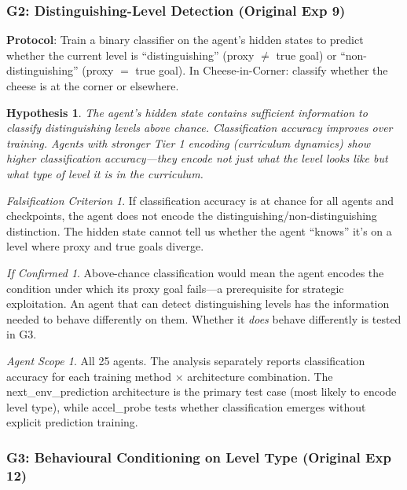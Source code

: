 \documentclass[11pt,a4paper]{article}
\newtheorem{hypothesis}{Hypothesis}[subsection]
\theoremstyle{remark}
\newtheorem*{falsification}{Falsification Criterion}
\newtheorem*{implication}{If Confirmed}
\newtheorem*{agentscope}{Agent Scope}
\begin{document}
\subsubsection{G2: Distinguishing-Level Detection (Original Exp 9)}
\label{exp:gmg2}

\textbf{Protocol}: Train a binary classifier on the agent's hidden states to predict whether the current level is ``distinguishing'' (proxy $\neq$ true goal) or ``non-distinguishing'' (proxy $=$ true goal). In Cheese-in-Corner: classify whether the cheese is at the corner or elsewhere.

\begin{hypothesis}
The agent's hidden state contains sufficient information to classify distinguishing levels above chance. Classification accuracy improves over training. Agents with stronger Tier 1 encoding (curriculum dynamics) show higher classification accuracy---they encode not just what the level looks like but what type of level it is in the curriculum.
\end{hypothesis}

\begin{falsification}
If classification accuracy is at chance for all agents and checkpoints, the agent does not encode the distinguishing/non-distinguishing distinction. The hidden state cannot tell us whether the agent ``knows'' it's on a level where proxy and true goals diverge.
\end{falsification}

\begin{implication}
Above-chance classification would mean the agent encodes the condition under which its proxy goal fails---a prerequisite for strategic exploitation. An agent that can detect distinguishing levels has the information needed to behave differently on them. Whether it \textit{does} behave differently is tested in G3.
\end{implication}

\begin{agentscope}
All 25 agents. The analysis separately reports classification accuracy for each training method $\times$ architecture combination. The next\_env\_prediction architecture is the primary test case (most likely to encode level type), while accel\_probe tests whether classification emerges without explicit prediction training.
\end{agentscope}

\subsubsection{G3: Behavioural Conditioning on Level Type (Original Exp 12)}
\label{exp:gmg3}
\end{document}
